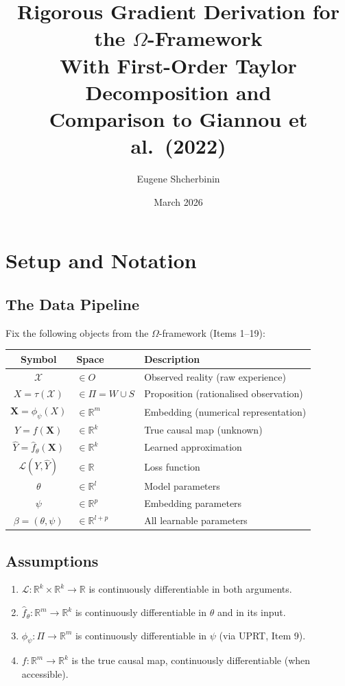 \documentclass[11pt,a4paper]{article}
\title{\textbf{Rigorous Gradient Derivation for the $\Omega$-Framework}\\[0.5em]
\large With First-Order Taylor Decomposition and\\Comparison to Giannou et al.\ (2022)}
\author{Eugene Shcherbinin}
\date{March 2026}
\newcommand{\R}{\mathbb{R}}
\newcommand{\calL}{\mathcal{L}}
\newcommand{\calX}{\mathcal{X}}
\newcommand{\bX}{\mathbf{X}}
\begin{document}
\maketitle

\tableofcontents
\newpage

\section{Setup and Notation}

\subsection{The Data Pipeline}

Fix the following objects from the $\Omega$-framework (Items 1--19):

\begin{center}
\begin{tabular}{cll}
\toprule
\textbf{Symbol} & \textbf{Space} & \textbf{Description} \\
\midrule
$\calX$ & $\in O$ & Observed reality (raw experience) \\
$X = \tau(\calX)$ & $\in \Pi = W \cup S$ & Proposition (rationalised observation) \\
$\bX = \phi_\psi(X)$ & $\in \R^m$ & Embedding (numerical representation) \\
$Y = f(\bX)$ & $\in \R^k$ & True causal map (unknown) \\
$\hat{Y} = \hat{f}_\theta(\bX)$ & $\in \R^k$ & Learned approximation \\
$\calL(Y, \hat{Y})$ & $\in \R$ & Loss function \\
\midrule
$\theta$ & $\in \R^l$ & Model parameters \\
$\psi$ & $\in \R^p$ & Embedding parameters \\
$\beta = (\theta, \psi)$ & $\in \R^{l+p}$ & All learnable parameters \\
\bottomrule
\end{tabular}
\end{center}

\subsection{Assumptions}

\begin{enumerate}[label=(A\arabic*)]
\item $\calL : \R^k \times \R^k \to \R$ is continuously differentiable in both arguments.
\item $\hat{f}_\theta : \R^m \to \R^k$ is continuously differentiable in $\theta$ and in its input.
\item $\phi_\psi : \Pi \to \R^m$ is continuously differentiable in $\psi$ (via UPRT, Item 9).
\item $f : \R^m \to \R^k$ is the true causal map, continuously differentiable (when accessible).
\end{enumerate}
\end{document}
